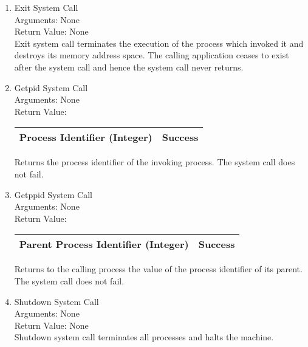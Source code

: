 \begin{enumerate}
\item{Exit System Call}\\
Arguments: None\\
Return Value: None\\

Exit system call terminates the execution of the process which invoked it and destroys its memory address space. The calling application ceases to exist after the system call and hence the system call never returns.


\item{Getpid System Call}\\
Arguments: None\\
Return Value:
\FloatBarrier \begin{table}[H]
\centering
\begin{tabular}{|l|l|}
\hline
Process Identifier (Integer)	& Success \\ \hline
\end{tabular}
\end{table} \FloatBarrier 

 Returns the process identifier of the invoking process. The system call does not fail.


\item{Getppid System Call}\\
Arguments: None\\
Return Value:
\FloatBarrier \begin{table}[H]
\centering
\begin{tabular}{|l|l|}
\hline
Parent Process Identifier (Integer)	& Success \\ \hline
\end{tabular}
\end{table} \FloatBarrier 

 Returns to the calling process the value of the process identifier of its parent. The system call does not fail.


\item{Shutdown System Call}\\
Arguments: None\\
Return Value: None \\

Shutdown system call terminates all processes and halts the machine. 
\end{enumerate}

